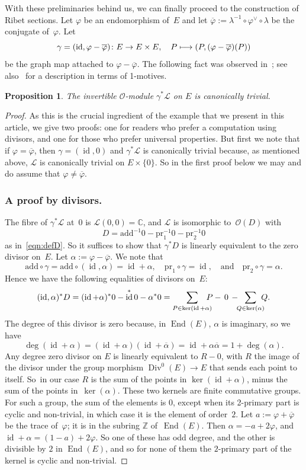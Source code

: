 \documentclass[JEP,XML,SOM,Unicode,NoFloatCountersInSection]{cedram}
\let\mathcal\mathscr
\def\mto{\mathchoice{\longmapsto}{\mapsto}{\mapsto}{\mapsto}}
\let\oldvee\vee
\renewcommand{\vee}{{\scriptscriptstyle\oldvee}}
\theoremstyle{plain}
\newtheorem{Proposition}[subsection]{Proposition}
\theoremstyle{definition}
\numberwithin{equation}{subsection}
\let\ol\overline
\let\phi\varphi
\renewcommand{\C}{\mathbb C}
\newcommand{\Z}{\mathbb Z}
\newcommand{\calL}{\mathcal{L}}
\newcommand{\calO}{\mathcal{O}}
\newcommand{\add}{\mathrm{add}}
\newcommand{\pr}{\mathrm{pr}}
\DeclareMathOperator{\Div}{Div}
\DeclareMathOperator{\End}{End}
\DeclareMathOperator{\id}{id}
\begin{document}
With these preliminaries behind us, we can finally proceed to the
construction of Ribet sections. Let $\phi$ be an endomorphism of~$E$
and let $\ol{\phi}:=\lambda^{-1}\circ\phi^\vee\circ\lambda$ be the
conjugate of~$\phi$. Let
\[
\gamma=
(\id,\phi-\ol{\phi})\colon
E\to E\times E, \quad P\mto (P,(\phi-\ol{\phi})(P))
\]
be the graph map attached to $\phi-\ol{\phi}$. The following fact was
observed in~\cite{Breen}; see also~\cite{Jacquinot-Ribet} for
a description in terms of 1-motives.
\begin{Proposition}\label{prop:t_phi}
The invertible $\calO$-module $\gamma^*\calL$ on $E$ is canonically trivial.
\end{Proposition}
\begin{proof}
As this is the crucial ingredient of the example that we present in
this article, we give two proofs: one for readers who prefer a
computation using divisors, and one for those who prefer universal
properties. But first we note that if $\phi=\ol{\phi}$, then
$\gamma=(\id,0)$ and $\gamma^*\calL$ is canonically trivial because,
as mentioned above, $\calL$ is canonically trivial on
$E\times\{0\}$. So in the first proof below we may and do assume that
$\phi\neq\ol{\phi}$.

\subsubsection*{A proof by divisors.} The fibre of
$\gamma^*\calL$ at~$0$ is $\calL(0,0)=\C$, and $\calL$ is
isomorphic to~$\calO(D)$ with
\[
D=\add^{-1}0-\pr_1^{-1}0-\pr_2^{-1}0
\]
as in~\eqref{eqn:defD}. So it suffices to show that $\gamma^*D$ is
linearly equivalent to the zero divisor on~$E$. Let
$\alpha:=\phi-\ol{\phi}$. We note that
\[
\add\circ\gamma = \add\circ(\id,\alpha) = \id+\alpha,\quad
\pr_1\circ\gamma = \id,\quad\text{and}\quad
\pr_2\circ\gamma = \alpha.
\]
Hence we have the following equalities of divisors on~$E$:
\[
(\id,\alpha)^*D = (\id+\alpha)^*0 - \id^*0 - \alpha^*0
= \sum_{P\in\ker(\id+\alpha)}\hspace*{-3mm}P -\, 0\, - {}\hspace*{-2mm}\sum_{Q\in\ker(\alpha)}\hspace*{-2mm}Q.
\]
The degree of this divisor is zero because, in $\End(E)$, $\alpha$ is
imaginary, so we have
\[
\deg(\id+\alpha) =
(\id+\alpha)(\id+\ol{\alpha})=\id+\alpha\ol{\alpha}
=1+\deg(\alpha).
\]
Any degree zero divisor on $E$ is linearly equivalent to $R-0$, with
$R$ the image of the divisor under the group morphism $\Div^0(E) \to
E$ that sends each point to itself. So~in our case $R$ is the sum of
the points in $\ker(\id+\alpha)$, minus the sum of the points
in~$\ker(\alpha)$. These two kernels are finite commutative
groups. For such a group, the sum of the elements is $0$, except when
its 2-primary part is cyclic and non-trivial, in which case it is the
element of order~$2$. Let $a:=\phi+\ol{\phi}$ be the trace
of~$\phi$; it is in the subring $\Z$ of~$\End(E)$. Then
$\alpha=-a+2\phi$, and $\id+\alpha=(1-a)+2\phi$. So one of these has
odd degree, and the other is divisible by $2$ in $\End(E)$, and so
for none of them the $2$-primary part of the kernel is cyclic and
non-trivial.


\end{proof}
\end{document}
